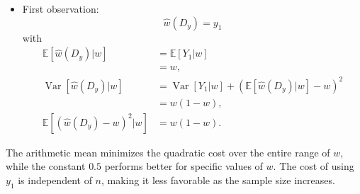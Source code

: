 \begin{example}
\begin{itemize}
		\item First observation:
		\begin{equation}
			\hat{w}(D_y) = y_1
		\end{equation}
		with
		\begin{equation}
			\begin{split}
				\mathbb{E}[\hat{w}(D_y)|w] &= \mathbb{E}[Y_1|w]\\
				& = w,\\
				\operatorname{Var}[\hat{w}(D_y)|w] &= \operatorname{Var}[Y_1|w] +(\mathbb{E}[\hat{w}(D_y)|w]-w)^2\\
				&= w(1-w),\\
				\mathbb{E}[(\hat{w}(D_y)-w)^2|w] &= w(1-w).
			\end{split}
		\end{equation}
	\end{itemize}
	The arithmetic mean minimizes the quadratic cost over the entire range of $w$, while the constant $0.5$ performs better for specific values of $w$. The cost of using $y_1$ is independent of $n$, making it less favorable as the sample size increases.
\end{example}


